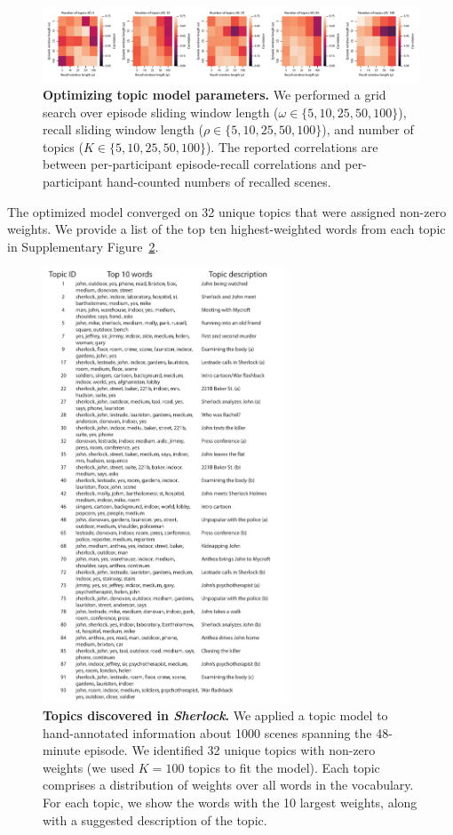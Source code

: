 \documentclass{article}
\begin{document}
\begin{figure}[b]
\centering
\includegraphics[width=1\textwidth]{figs/parameter_search}
\caption{\small \textbf{Optimizing topic model parameters.}  We performed a grid search over episode sliding window length ($\omega \in \{5, 10, 25, 50, 100 \}$), recall sliding window length ($\rho \in \{5, 10, 25, 50, 100 \}$), and number of topics ($K \in \{5, 10, 25, 50, 100 \}$).  The reported correlations are between per-participant episode-recall correlations and per-participant hand-counted numbers of recalled scenes.}
\label{fig:paramsearch}
\end{figure}

The optimized model converged on 32 unique topics that were assigned non-zero weights.  We provide a list of the top ten highest-weighted words from each topic in Supplementary Figure~\ref{fig:topics}.

\begin{figure}[p]
\centering
\includegraphics[width=0.65\textwidth]{figs/topic_words}
\caption{\small \textbf{Topics discovered in \textit{Sherlock}.} We applied a topic model to hand-annotated information about 1000 scenes spanning the 48-minute episode.  We identified 32 unique topics with non-zero weights (we used $K=100$ topics to fit the model).  Each topic comprises a distribution of weights over all words in the vocabulary.  For each topic, we show the words with the 10 largest weights, along with a suggested description of the topic.}
\label{fig:topics}
\end{figure}
\end{document}
